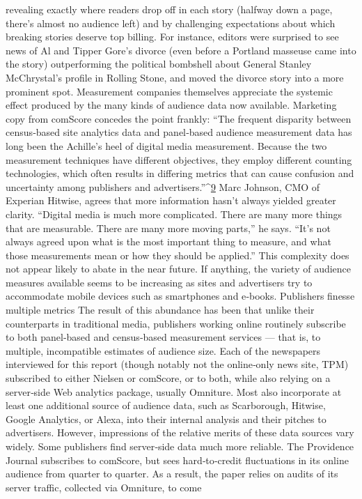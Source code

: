revealing exactly where readers drop off in each story (halfway down a
page, there’s almost no audience left) and by challenging expectations
about which breaking stories deserve top billing. For instance, editors
were surprised to see news of Al and Tipper Gore’s divorce (even before a
Portland masseuse came into the story) outperforming the political
bombshell about General Stanley McChrystal’s profile in Rolling Stone,
and moved the divorce story into a more prominent spot.
Measurement companies themselves appreciate the systemic effect
produced by the many kinds of audience data now available. Marketing
copy from comScore concedes the point frankly:
``The frequent disparity between census‐based site analytics data
and panel‐based audience measurement data has long been the
Achille’s heel of digital media measurement. Because the two
measurement techniques have different objectives, they employ
different counting technologies, which often results in differing
metrics that can cause confusion and uncertainty among publishers
and advertisers.''^{\href{#endnotes}{9}}
Marc Johnson, CMO of Experian Hitwise, agrees that more information
hasn’t always yielded greater clarity. ``Digital media is much more
complicated. There are many more things that are measurable. There are
many more moving parts,'' he says. ``It’s not always agreed upon what is
the most important thing to measure, and what those measurements mean
or how they should be applied.''
This complexity does not appear likely to abate in the near future. If
anything, the variety of audience measures available seems to be
increasing as sites and advertisers try to accommodate mobile devices
such as smartphones and e‐books.
Publishers finesse multiple metrics
The result of this abundance has been that unlike their counterparts in
traditional media, publishers working online routinely subscribe to both
panel‐based and census‐based measurement services — that is, to
multiple, incompatible estimates of audience size. Each of the newspapers
interviewed for this report (though notably not the online‐only news site,
TPM) subscribed to either Nielsen or comScore, or to both, while also
relying on a server‐side Web analytics package, usually Omniture. Most
also incorporate at least one additional source of audience data, such as
Scarborough, Hitwise, Google Analytics, or Alexa, into their internal
analysis and their pitches to advertisers.
However, impressions of the relative merits of these data sources vary
widely. Some publishers find server‐side data much more reliable. The
Providence Journal subscribes to comScore, but sees hard‐to‐credit
fluctuations in its online audience from quarter to quarter. As a result, the
paper relies on audits of its server traffic, collected via Omniture, to come

